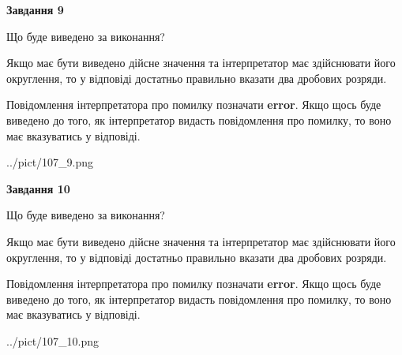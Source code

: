 \documentclass[12pt, ukrainian]{article}
\begin{document}
{\begin {Large}
{\begin {center}\textbf{Завдання 9}\end {center}}\par
Що буде виведено за виконання? \par

Якщо має бути виведено дійсне значення та інтерпретатор має здійснювати його округлення, 
то у відповіді достатньо правильно вказати два дробових розряди.

Повідомлення інтерпретатора про помилку позначати \textbf{error}.
Якщо щось буде виведено до того, як інтерпретатор видасть повідомлення про помилку, 
то воно має вказуватись у відповіді. \par

\begin{center}
	{../pict/107_9.png}
\end{center}
\newpage

{\begin {center}\textbf{Завдання 10}\end {center}}\par
Що буде виведено за виконання? \par

Якщо має бути виведено дійсне значення та інтерпретатор має здійснювати його округлення, 
то у відповіді достатньо правильно вказати два дробових розряди.

Повідомлення інтерпретатора про помилку позначати \textbf{error}.
Якщо щось буде виведено до того, як інтерпретатор видасть повідомлення про помилку, 
то воно має вказуватись у відповіді. \par

\begin{center}
	{../pict/107_10.png}
\end{center}
\newpage

\end {Large}}
\end{document}
